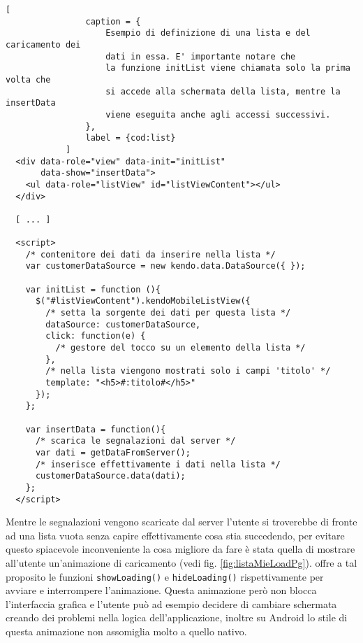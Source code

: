             \begin{lstlisting}[
                caption = {
                    Esempio di definizione di una lista e del caricamento dei
                    dati in essa. E' importante notare che
                    la funzione initList viene chiamata solo la prima volta che
                    si accede alla schermata della lista, mentre la insertData
                    viene eseguita anche agli accessi successivi.
                },
                label = {cod:list}
            ]
  <div data-role="view" data-init="initList"
       data-show="insertData">
    <ul data-role="listView" id="listViewContent"></ul>
  </div>

  [ ... ]

  <script>
    /* contenitore dei dati da inserire nella lista */
    var customerDataSource = new kendo.data.DataSource({ });

    var initList = function (){
      $("#listViewContent").kendoMobileListView({
        /* setta la sorgente dei dati per questa lista */
        dataSource: customerDataSource,
        click: function(e) {
          /* gestore del tocco su un elemento della lista */
        },
        /* nella lista viengono mostrati solo i campi 'titolo' */
        template: "<h5>#:titolo#</h5>"
      });
    };

    var insertData = function(){
      /* scarica le segnalazioni dal server */
      var dati = getDataFromServer();
      /* inserisce effettivamente i dati nella lista */
      customerDataSource.data(dati);
    };
  </script>
            \end{lstlisting}

            \noindent Mentre le segnalazioni vengono scaricate dal server l'utente si
            troverebbe di fronte ad una lista vuota senza capire effettivamente
            cosa stia succedendo, per evitare questo spiacevole inconveniente
            la cosa migliore da fare è stata quella di mostrare all'utente un'animazione
            di caricamento (vedi fig. \ref{fig:listaMieLoadPg}). \kendomob{} offre a tal proposito le funzioni
            \texttt{showLoading()} e \texttt{hideLoading()} rispettivamente per
            avviare e interrompere l'animazione. Questa animazione però non blocca
            l'interfaccia grafica e l'utente può ad esempio decidere
            di cambiare schermata creando dei problemi nella logica dell'applicazione,
            inoltre su Android lo stile di questa animazione non assomiglia molto
            a quello nativo.

